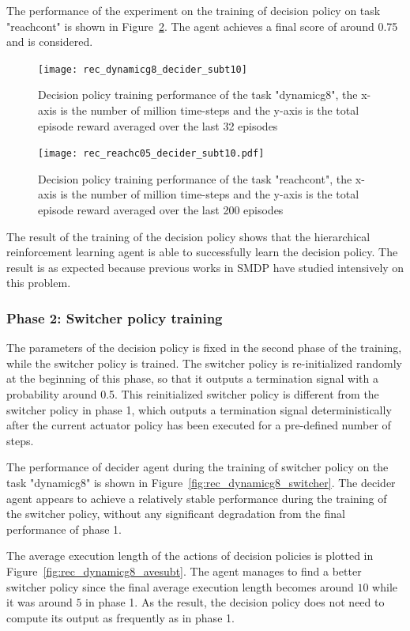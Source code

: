 The performance of the experiment on the training of decision policy on task "reachcont" is shown in Figure~\ref{fig:rec_reachc05_decider_subt10}. The agent achieves a final score of around 0.75 and is considered.


\begin{figure}[!htbp]
\centering
\texttt{[image: rec\_dynamicg8\_decider\_subt10]}
\caption{Decision policy training performance of the task "dynamicg8", the x-axis is the number of million time-steps and the y-axis is the total episode reward averaged over the last 32 episodes}
\label{fig:rec_dynamicg8_decider_subt10}
\end{figure}


\begin{figure}
\centering
\texttt{[image: rec\_reachc05\_decider\_subt10.pdf]}
\caption{Decision policy training performance of the task "reachcont", the x-axis is the number of million time-steps and the y-axis is the total episode reward averaged over the last 200 episodes}
\label{fig:rec_reachc05_decider_subt10}
\end{figure}

The result of the training of the decision policy shows that the hierarchical reinforcement learning agent is able to successfully learn the decision policy. The result is as expected because previous works in SMDP have studied intensively on this problem.

\subsubsection{Phase 2: Switcher policy training}
The parameters of the decision policy is fixed in the second phase of the training, while the switcher policy is trained. The switcher policy is re-initialized randomly at the beginning of this phase, so that it outputs a termination signal with a probability around 0.5. This reinitialized switcher policy is different from the switcher policy in phase 1, which outputs a termination signal deterministically after the current actuator policy has been executed for a pre-defined number of steps.

The performance of decider agent during the training of switcher policy on the task "dynamicg8" is shown in Figure~\ref{fig:rec_dynamicg8_switcher}. The decider agent appears to achieve a relatively stable performance during the training of the switcher policy, without any significant degradation from the final performance of phase 1.

The average execution length of the actions of decision policies is plotted in Figure~\ref{fig:rec_dynamicg8_avesubt}. The agent manages to find a better switcher policy since the final average execution length becomes around $10$ while it was around $5$ in phase 1. As the result, the decision policy does not need to compute its output as frequently as in phase 1.


